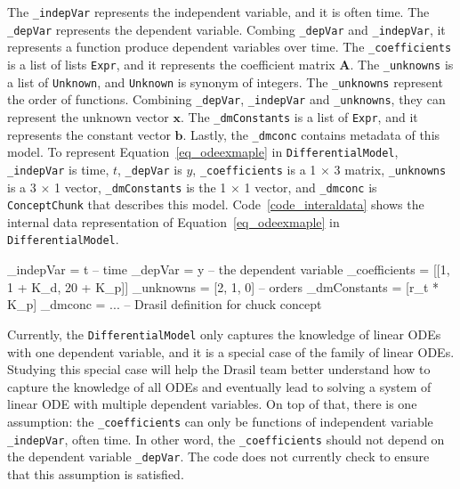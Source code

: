 The \verb|_indepVar| represents the independent variable, and it is often time. The \verb|_depVar| represents the dependent variable. Combing \verb|_depVar| and \verb|_indepVar|, it represents a function produce dependent variables over time. The \verb|_coefficients| is a list of lists \verb|Expr|, and it represents the coefficient matrix $\boldsymbol{A}$. The \verb|_unknowns| is a list of \verb|Unknown|, and \verb|Unknown| is synonym of integers.
The \verb|_unknowns| represent the order of functions. Combining \verb|_depVar|, \verb|_indepVar| and \verb|_unknowns|, they can represent the unknown vector $\boldsymbol{x}$. The \verb|_dmConstants| is a list of \verb|Expr|, and it represents the constant vector $\boldsymbol{b}$. Lastly, the \verb|_dmconc| contains metadata of this model. To represent Equation~\ref{eq_odeexmaple} in \verb|DifferentialModel|, \verb|_indepVar| is time, $t$, \verb|_depVar| is $y$, \verb|_coefficients| is a 1 $\times$ 3 matrix, \verb|_unknowns| is a 3 $\times$ 1 vector, \verb|_dmConstants| is the 1 $\times$ 1 vector, and \verb|_dmconc| is \verb|ConceptChunk| that describes this model. Code~\ref{code_interaldata} shows the internal data representation of Equation~\ref{eq_odeexmaple} in \verb|DifferentialModel|.

\begin{listing}[ht]
\begin{haskell1}
_indepVar = t -- time
_depVar = y -- the dependent variable
_coefficients = [[1, 1 + K_d, 20 + K_p]]
_unknowns = [2, 1, 0] -- orders
_dmConstants = [r_t * K_p]
_dmconc = ... -- Drasil definition for chuck concept
\end{haskell1}
\label{code_interaldata}
\end{listing}

Currently, the \verb|DifferentialModel| only captures the knowledge of linear ODEs with one dependent variable, and it is a special case of the family of linear ODEs. Studying this special case will help the Drasil team better understand how to capture the knowledge of all ODEs and eventually lead to solving a system of linear ODE with multiple dependent variables. On top of that, there is one assumption: the \verb|_coefficients| can only be functions of independent variable \verb|_indepVar|, often time. In other word, the \verb|_coefficients| should not depend on the dependent variable \verb|_depVar|. The code does not currently check to ensure that this assumption is satisfied.

